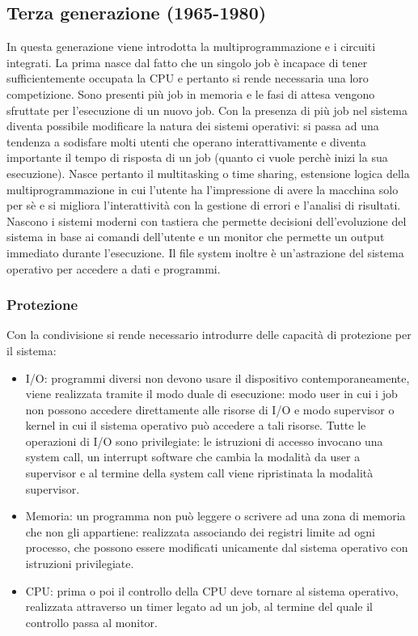 \subsection{Terza generazione (1965-1980)}
In questa generazione viene introdotta la multiprogrammazione e i circuiti integrati. La prima nasce dal fatto che un singolo job \`e incapace di tener sufficientemente occupata la CPU e pertanto si rende
necessaria una loro competizione. Sono presenti pi\`u job in memoria e le fasi di attesa vengono sfruttate per l'esecuzione di un nuovo job.
Con la presenza di pi\`u job nel sistema diventa possibile modificare la natura dei sistemi operativi: si passa ad una tendenza a sodisfare molti utenti che
operano interattivamente e diventa importante il tempo di risposta di un job (quanto ci vuole perch\`e inizi la sua esecuzione). Nasce pertanto il
multitasking o time sharing, estensione logica della multiprogrammazione in cui l'utente ha l'impressione di avere la macchina solo per s\`e e si migliora
l'interattivit\`a con la gestione di errori e l'analisi di risultati. Nascono i sistemi moderni con tastiera che permette decisioni dell'evoluzione del
sistema in base ai comandi dell'utente e un monitor che permette un output immediato durante l'esecuzione. Il file system inoltre \`e un'astrazione del
sistema operativo per accedere a dati e programmi.
\subsubsection{Protezione}
Con la condivisione si rende necessario introdurre delle capacit\`a di protezione per il sistema:
\begin{itemize}
	\item I/O: programmi diversi non devono usare il dispositivo contemporaneamente, viene realizzata tramite il modo duale di esecuzione: modo user in cui i
	      job non possono accedere direttamente alle risorse di I/O e modo supervisor o kernel in cui il sistema operativo pu\`o accedere a tali risorse. Tutte le
	      operazioni di I/O sono privilegiate: le istruzioni di accesso invocano una system call, un interrupt software che cambia la modalit\`a da user a supervisor
	      e al termine della system call viene ripristinata la modalit\`a supervisor.
	\item Memoria: un programma non pu\`o leggere o scrivere ad una zona di memoria che non gli appartiene: realizzata associando dei registri limite ad ogni
	      processo, che possono essere modificati unicamente dal sistema operativo con istruzioni privilegiate.
	\item CPU: prima o poi il controllo della CPU deve tornare al sistema operativo, realizzata attraverso un timer legato ad un job, al termine del quale il
	      controllo passa al monitor.
\end{itemize}
